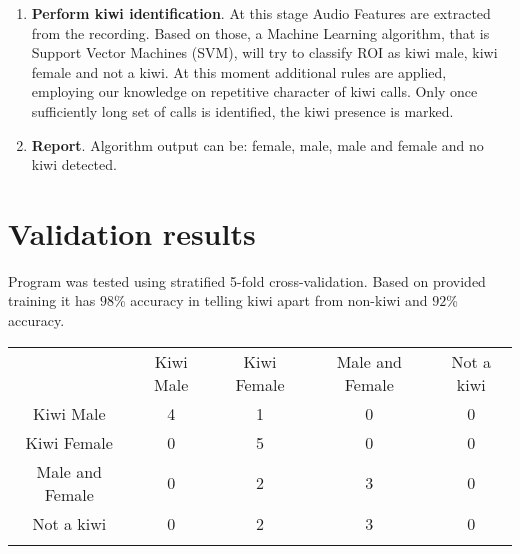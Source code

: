 \documentclass[paper=a4, fontsize=11pt]{scrartcl}	%
\numberwithin{equation}{section}		%
\numberwithin{figure}{section}			%
\numberwithin{table}{section}				%
\begin{document}
\begin{enumerate}
	\item \textbf{Perform kiwi identification}. At this stage Audio Features are extracted from the recording. Based on those, a Machine Learning algorithm, that is Support Vector Machines (SVM), will try to classify ROI as kiwi male, kiwi female and not a kiwi. At this moment additional rules are applied, employing our knowledge on repetitive character of kiwi calls. Only once sufficiently long set of calls is identified, the kiwi presence is marked. 
	\item \textbf{Report}. Algorithm output can be: female, male, male and female and no kiwi detected.
\end{enumerate}

\section{Validation results}
Program was tested using stratified 5-fold cross-validation. Based on provided training it has $98$\% accuracy in telling kiwi apart from non-kiwi and $92$\% accuracy.

\begin{tabularx}{.7\textwidth}{c|c c c c |}
 & Kiwi Male & Kiwi Female & Male and Female & \multicolumn{1}{c}{Not a kiwi} \\
\hhline{-----}
Kiwi Male & 4 \cellcolor[gray]{.8}& 1 & 0 & 0 \\
Kiwi Female & 0 & 5 \cellcolor[gray]{.8}& 0 & 0 \\
Male and Female & 0 & 2 & 3 \cellcolor[gray]{.8} & 0 \\
Not a kiwi & 0 & 2 & 3 & 0 \cellcolor[gray]{.8} \\
\hhline{~----}
\end{tabularx}

\end{document}
